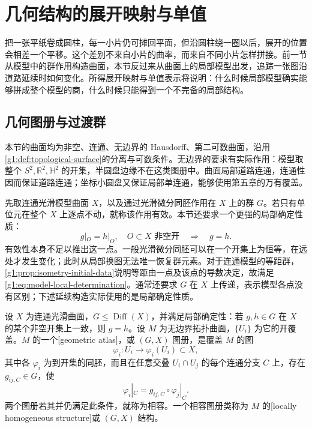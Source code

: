 
% 
% 
% 

\section{几何结构的展开映射与单值}
\label{g1:sec:1003}

把一张平纸卷成圆柱，每一小片仍可摊回平面，但沿圆柱绕一圈以后，展开的位置会相差一个平移。这个差别不来自小片的曲率，而来自不同小片怎样拼接。前一节从模型中的群作用构造曲面，本节反过来从曲面上的局部模型出发，追踪一张图沿道路延续时如何变化。所得展开映射与单值表示将说明：什么时候局部模型确实能够拼成整个模型的商，什么时候只能得到一个不完备的局部结构。

\subsection{几何图册与过渡群}
\label{g1:subsec:1003:01}

本节的曲面均为非空、连通、无边界的 Hausdorff、第二可数曲面，沿用\cref{g1:def:topological-surface}的分离与可数条件。无边界的要求有实际作用：模型取整个 \(S^2,\mathbb R^2,\mathbb H^2\) 的开集，半圆盘边缘不在这类图册中。曲面局部道路连通，连通性因而保证道路连通；坐标小圆盘又保证局部单连通，能够使用第五章的万有覆盖。

\ProseParagraphBreak

先取连通光滑模型曲面 \(X\)，以及通过光滑微分同胚作用在 \(X\) 上的群 \(G\)。若只有单位元在整个 \(X\) 上逐点不动，就称该作用有效。本节还要求一个更强的局部确定性质：
\begin{equation}
	\label{g1:eq:model-local-determination}
	g|_O=h|_O,\quad O\subset X\text{ 非空开}
	\quad\Longrightarrow\quad g=h.
\end{equation}
有效性本身不足以推出这一点。一般光滑微分同胚可以在一个开集上为恒等，在远处才发生变化；此时从局部换图无法唯一恢复群元素。对于连通模型的等距群，\cref{g1:prop:isometry-initial-data}说明等距由一点及该点的导数决定，故满足\eqref{g1:eq:model-local-determination}。通常还要求 \(G\) 在 \(X\) 上传递，表示模型各点没有区别；下述延续构造实际使用的是局部确定性质。

\begin{definition}
	\label{g1:def:geometry-atlas}
	设 \(X\) 为连通光滑曲面，\(G\le\operatorname{Diff}(X)\)，并满足局部确定性：若 \(g,h\in G\) 在 \(X\) 的某个非空开集上一致，则 \(g=h\)。设 \(M\) 为无边界拓扑曲面，\(\{U_i\}\) 为它的开覆盖。\(M\) 的一个[geometric atlas]，或 \((G,X)\) 图册，是覆盖 \(M\) 的图
	\[
		\varphi_i:U_i\longrightarrow\varphi_i(U_i)\subset X,
	\]
	其中各 \(\varphi_i\) 为到开集的同胚，而且在任意交叠 \(U_i\cap U_j\) 的每个连通分支 \(C\) 上，存在 \(g_{ij,C}\in G\)，使
	\[
		\varphi_i|_C=g_{ij,C}\circ\varphi_j|_C.
	\]
	两个图册若其并仍满足此条件，就称为相容。一个相容图册类称为 \(M\) 的[locally homogeneous structure]或 \((G,X)\) 结构。
\end{definition}

